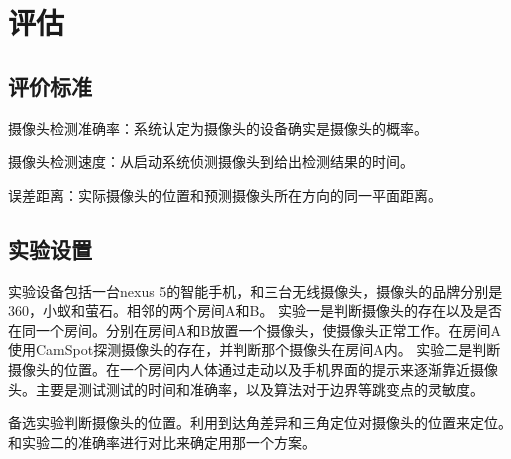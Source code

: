 \documentclass[UTF8]{ctexart}
\begin{document}
\section{评估}
\subsection{评价标准}
摄像头检测准确率：系统认定为摄像头的设备确实是摄像头的概率。

摄像头检测速度：从启动系统侦测摄像头到给出检测结果的时间。

误差距离：实际摄像头的位置和预测摄像头所在方向的同一平面距离。


\subsection{实验设置}
实验设备包括一台nexus 5的智能手机，和三台无线摄像头，摄像头的品牌分别是360，小蚁和萤石。相邻的两个房间A和B。
实验一是判断摄像头的存在以及是否在同一个房间。分别在房间A和B放置一个摄像头，使摄像头正常工作。在房间A使用CamSpot探测摄像头的存在，并判断那个摄像头在房间A内。
实验二是判断摄像头的位置。在一个房间内人体通过走动以及手机界面的提示来逐渐靠近摄像头。主要是测试测试的时间和准确率，以及算法对于边界等跳变点的灵敏度。

备选实验判断摄像头的位置。利用到达角差异和三角定位对摄像头的位置来定位。和实验二的准确率进行对比来确定用那一个方案。



\end{document}
